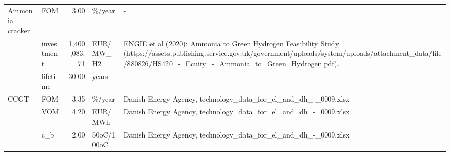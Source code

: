 \begin{longtable}{p{5cm}p{3cm}rp{3cm}p{11cm}}
\bottomrule
\endlastfoot
Ammonia cracker & FOM &           3.00 &                            \%/year &                                                                                                                                                                                                                                                                                                                                    - \\
                      & investment &   1,400,083.71 &                         EUR/MW\_H2 &                                                                                                             ENGIE et al (2020): Ammonia to Green Hydrogen Feasibility Study (https://assets.publishing.service.gov.uk/government/uploads/system/uploads/attachment\_data/file/880826/HS420\_-\_Ecuity\_-\_Ammonia\_to\_Green\_Hydrogen.pdf). \\
                      & lifetime &          30.00 &                             years &                                                                                                                                                                                                                                                                                                                                    - \\
CCGT & FOM &           3.35 &                            \%/year &                                                                                                                                                                                                                                                                      Danish Energy Agency, technology\_data\_for\_el\_and\_dh\_-\_0009.xlsx \\
                      & VOM &           4.20 &                           EUR/MWh &                                                                                                                                                                                                                                                                      Danish Energy Agency, technology\_data\_for\_el\_and\_dh\_-\_0009.xlsx \\
                      & c\_b &           2.00 &                        50oC/100oC &                                                                                                                                                                                                                                                                      Danish Energy Agency, technology\_data\_for\_el\_and\_dh\_-\_0009.xlsx \\

\end{longtable}
